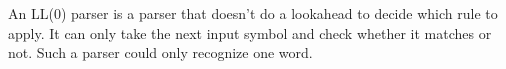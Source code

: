 An LL(0) parser is a parser that doesn’t do a lookahead to decide which rule to apply. It can only take
the next input symbol and check whether it matches or not. Such a parser could only recognize one
word.